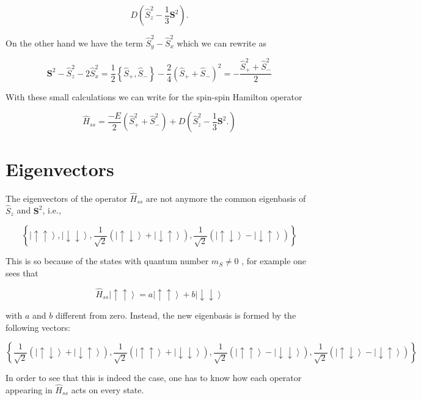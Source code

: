 \documentclass[A4paper, 12pt]{article}
\newcommand{\uu}{\left | \uparrow\uparrow \right \rangle}
\newcommand{\dd}{\left | \downarrow\downarrow \right \rangle}
\newcommand{\du}{\left | \downarrow\uparrow \right \rangle}
\newcommand{\ud}{\left | \uparrow\downarrow \right \rangle}
\newcommand{\mone}{\frac{1}{\sqrt{2}}\left( \ud + \du\right)}
\newcommand{\mmone}{\frac{1}{\sqrt{2}}\left( \ud - \du\right)}
\newcommand{\x}{\frac{1}{\sqrt 2}\left( \uu + \dd\right)}
\newcommand{\y}{\frac{1}{\sqrt 2}\left( \uu - \dd\right)}
\begin{document}
\begin{equation}
  D
  \left(
    \hat{S} _{z} ^{2} - \frac{1}{3} \mathbf{S} ^{2}
  \right).
\end{equation}

On the other hand we have the term $ \hat{S} _{y} ^{2} -\hat{S} _{x} ^{2}  $
which we can rewrite as

\begin{equation}
  \mathbf{S} ^{2} - \hat{S}_{z}^{2} - 2 \hat{S}_{x}^{2}
  =
  \frac{1}{2}\left\{\hat{S} _{+} , \hat{S} _{-}  \right\}
  - \frac{2}{4}\left( \hat{S} _{+}  + \hat{S} _{-}   \right) ^{2}
  =
  -\frac{\hat{S} _{+} ^{2} + \hat{S} _{-} ^{2}}{2}
\end{equation}

With these small calculations we can write for the spin-spin Hamilton operator

\begin{equation}
  \hat{H} _{ss}
  =
  \frac{-E}{2}\left( \hat{S} _{+} ^{2} + \hat{S} _{-} ^{2}   \right)
  +
  D
  \left(
    \hat{S} _{z} ^{2} - \frac{1}{3} \mathbf{S}^{2}.
  \right)
\end{equation}





\section{Eigenvectors} %
\label{sec:eigenvectors}

The eigenvectors of the operator $ \hat{H} _{ss}   $ are not anymore the common eigenbasis of $ \hat{S}_{z} $ and $ \mathbf{S}^{2}  $, i.e.,

\begin{equation}
  \left\{
    \uu, \dd, \mone, \mmone
  \right\}
\end{equation}

This is so because of the states with quantum number $ m_S \neq 0 $ , for example one sees that

\begin{equation}
  \hat{H} _{ss} \uu = a\uu + b \dd
\end{equation}

with $ a $ and $ b $ different from zero.
Instead, the new eigenbasis is formed by the following vectors:

\begin{equation}
  \left\{\mone, \x, \y, \mmone \right\}
\end{equation}

In order to see that this is indeed the case, one has to know how each operator appearing in $ \hat{H} _{ss}  $  acts on every state.
\end{document}
